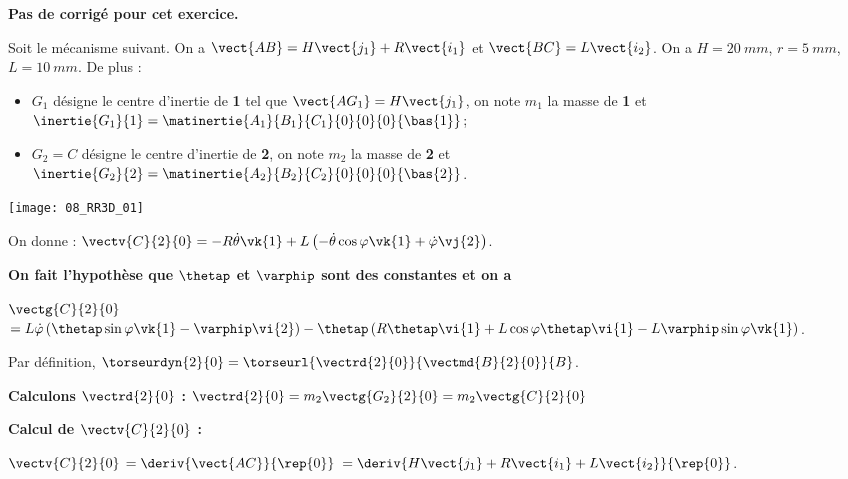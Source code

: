 \normalfalse \difficiletrue \tdifficilefalse
\correctionfalse


\setcounter{numques}{0}
\ifcorrection
\else
\textbf{Pas de corrigé pour cet exercice.}
\fi

\ifprof
\else
Soit le mécanisme suivant. On a $\vect{AB}=H\vect{j_1}+R\vect{i_1}$ et $\vect{BC}=L\vect{i_2}$. On a $H=\SI{20}{mm}$, $r=\SI{5}{mm}$, $L=\SI{10}{mm}$. De plus :
\begin{itemize}
\item $G_1$ désigne le centre d'inertie de \textbf{1} tel que $\vect{AG_1}=H\vect{j_1}$, on note $m_1$ la masse de \textbf{1} et $\inertie{G_1}{1}=\matinertie{A_1}{B_1}{C_1}{0}{0}{0}{\bas{1}}$; 
\item $G_2=C$ désigne le centre d'inertie de \textbf{2}, on note $m_2$ la masse de \textbf{2} et $\inertie{G_2}{2}=\matinertie{A_2}{B_2}{C_2}{0}{0}{0}{\bas{2}}$.
\end{itemize}
\begin{center}
\texttt{[image: 08\_RR3D\_01]}
\end{center}

\ifcolle
\else
On donne : 
$\vectv{C}{2}{0} = -R\dot{\theta}\vk{1}+L\left(-\dot{\theta}\cos\varphi\vk{1} + \dot{\varphi}\vj{2}\right)$.

\textbf{On fait l'hypothèse que $\thetap$ et $\varphip$ sont des constantes et on a }

$\vectg{C}{2}{0} $
$ =L\dot{\varphi}\left(\thetap\sin\varphi\vk{1}-\varphip\vi{2}\right)
-\thetap\left( R \thetap\vi{1} +L\cos\varphi \thetap\vi{1}
-L\varphip\sin\varphi\vk{1}\right)
$.
\fi


\fi

\ifprof


Par définition, $\torseurdyn{2}{0} = \torseurl{\vectrd{2}{0}}{\vectmd{B}{2}{0}}{B}$.

\textbf{Calculons $\vectrd{2}{0}$ : } 
$\vectrd{2}{0} = m_2\vectg{G_2}{2}{0}=m_2 \vectg{C}{2}{0} $

\textbf{Calcul de $\vectv{C}{2}{0}$ : }  

$\vectv{C}{2}{0}$ 
$=\deriv{\vect{AC}}{\rep{0}}$
$=\deriv{H\vect{j_1}+R\vect{i_1}+L\vect{i_2}}{\rep{0}}$.

